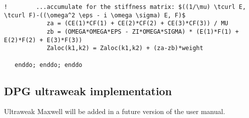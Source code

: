 \begin{lstlisting}[mathescape,caption=\file{MAXWELL/GALERKIN/}\routine{elem} routine]
!        ...accumulate for the stiffness matrix: $((1/\mu) \tcurl E, \tcurl F)-((\omega^2 \eps - i \omega \sigma) E, F)$
            za = (CE(1)*CF(1) + CE(2)*CF(2) + CE(3)*CF(3)) / MU
            zb = (OMEGA*OMEGA*EPS - ZI*OMEGA*SIGMA) * (E(1)*F(1) + E(2)*F(2) + E(3)*F(3))
            Zaloc(k1,k2) = Zaloc(k1,k2) + (za-zb)*weight

   enddo; enddo; enddo
\end{lstlisting}

\subsection{DPG ultraweak implementation}
\label{subsec:maxwell-galerkin}

Ultraweak Maxwell will be added in a future version of the user manual.

